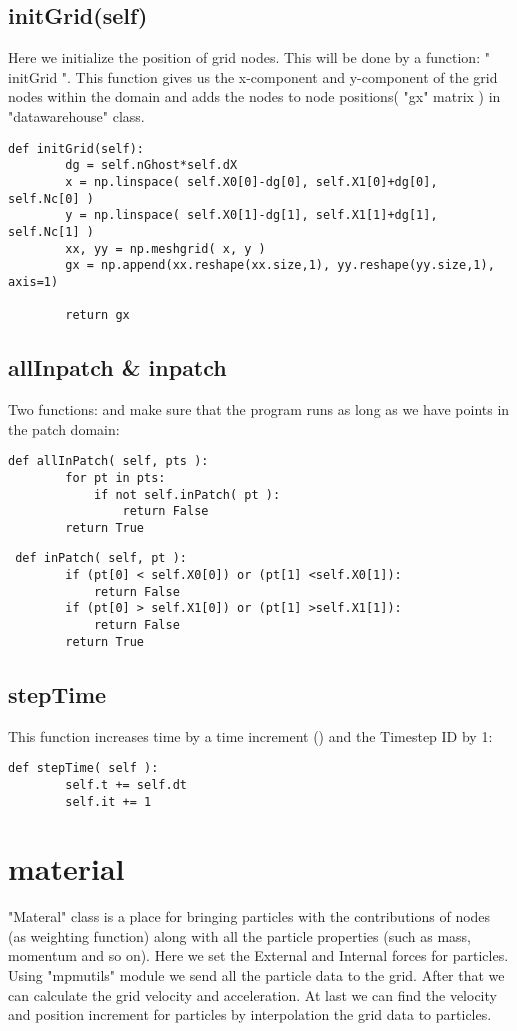 \section{initGrid(self)}
Here we initialize the position of grid nodes. This will be done by a function: " initGrid ". This function gives us the x-component and y-component of the grid nodes within the domain and adds the nodes to node positions( "gx" matrix ) in "datawarehouse" class.
\begin{lstlisting}
def initGrid(self):
        dg = self.nGhost*self.dX
        x = np.linspace( self.X0[0]-dg[0], self.X1[0]+dg[0], self.Nc[0] )
        y = np.linspace( self.X0[1]-dg[1], self.X1[1]+dg[1], self.Nc[1] )
        xx, yy = np.meshgrid( x, y )
        gx = np.append(xx.reshape(xx.size,1), yy.reshape(yy.size,1), axis=1)
        
        return gx
\end{lstlisting} 
\section{allInpatch \& inpatch}
Two functions:  and  make sure that the program runs as long as we have points in the patch domain:
\begin{lstlisting}
def allInPatch( self, pts ):
        for pt in pts:
            if not self.inPatch( pt ):
                return False
        return True
\end{lstlisting} 
\begin{lstlisting}
 def inPatch( self, pt ):
        if (pt[0] < self.X0[0]) or (pt[1] <self.X0[1]):
            return False
        if (pt[0] > self.X1[0]) or (pt[1] >self.X1[1]):
            return False
        return True
\end{lstlisting} 
\section{stepTime}
This function increases time by a time increment () and the Timestep ID by 1:
\begin{lstlisting}
def stepTime( self ):
        self.t += self.dt
        self.it += 1
\end{lstlisting} 
\chapter{material}
\label{chap:material}
"Materal" class is a place for bringing particles with the contributions of nodes (as weighting function) along with all the particle properties (such as mass, momentum and so on). Here we set the External and Internal forces for particles. Using "mpmutils" module we send all the particle data to the grid. After that we can calculate the grid velocity and acceleration. At last we can find the velocity and position increment for particles by interpolation the grid data to particles.
